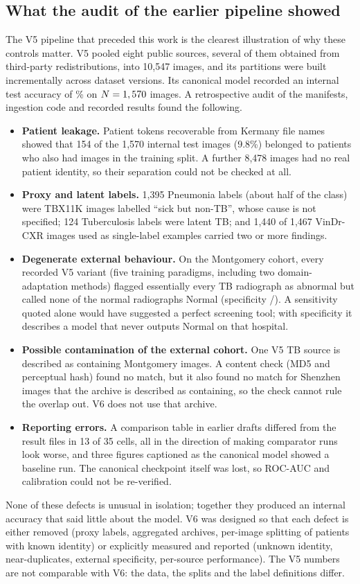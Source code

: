 \subsection{What the audit of the earlier pipeline showed}
\label{sec:disc-audit}
The V5 pipeline that preceded this work is the clearest illustration of why these controls matter. V5 pooled eight public sources, several of them obtained from third-party redistributions, into 10,547 images, and its partitions were built incrementally across dataset versions. Its canonical model recorded an internal test accuracy of \RVFiveAcc\% on $N=1,570$ images. A retrospective audit of the manifests, ingestion code and recorded results found the following.
\begin{itemize}
\item \textbf{Patient leakage.} Patient tokens recoverable from Kermany file names showed that 154 of the 1,570 internal test images (9.8\%) belonged to patients who also had images in the training split. A further 8,478 images had no real patient identity, so their separation could not be checked at all.
\item \textbf{Proxy and latent labels.} 1,395 Pneumonia labels (about half of the class) were TBX11K images labelled ``sick but non-TB'', whose cause is not specified; 124 Tuberculosis labels were latent TB; and 1,440 of 1,467 VinDr-CXR images used as single-label examples carried two or more findings.
\item \textbf{Degenerate external behaviour.} On the Montgomery cohort, every recorded V5 variant (five training paradigms, including two domain-adaptation methods) flagged essentially every TB radiograph as abnormal but called none of the normal radiographs Normal (specificity \RVFiveExtSpecK/\RVFiveExtSpecN). A sensitivity quoted alone would have suggested a perfect screening tool; with specificity it describes a model that never outputs Normal on that hospital.
\item \textbf{Possible contamination of the external cohort.} One V5 TB source is described as containing Montgomery images. A content check (MD5 and perceptual hash) found no match, but it also found no match for Shenzhen images that the archive is described as containing, so the check cannot rule the overlap out. V6 does not use that archive.
\item \textbf{Reporting errors.} A comparison table in earlier drafts differed from the result files in 13 of 35 cells, all in the direction of making comparator runs look worse, and three figures captioned as the canonical model showed a baseline run. The canonical checkpoint itself was lost, so ROC-AUC and calibration could not be re-verified.
\end{itemize}
None of these defects is unusual in isolation; together they produced an internal accuracy that said little about the model. V6 was designed so that each defect is either removed (proxy labels, aggregated archives, per-image splitting of patients with known identity) or explicitly measured and reported (unknown identity, near-duplicates, external specificity, per-source performance). The V5 numbers are not comparable with V6: the data, the splits and the label definitions differ.

